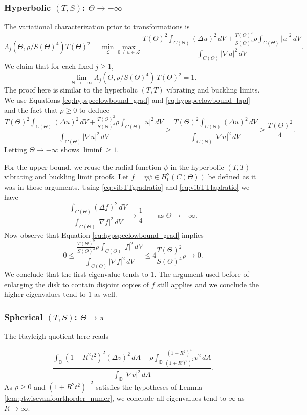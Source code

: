 \documentclass[11pt]{amsart}
\theoremstyle{definition}
\numberwithin{equation}{section}
\newcommand{\lapl}{\Delta}
\newcommand{\grad}{\nabla}
\newcommand{\D}{\mathbb{D}}
\begin{document}
\subsubsection*{Hyperbolic $(T,S)$: $\Theta \to -\infty$} 

The variational characterization prior to transformations is
\[
\Lambda_j(\Theta, \rho/S(\Theta)^4)T(\Theta)^2 = \min_{\mathcal{L}}\max_{0 \neq u \in \mathcal{L}}\dfrac{T(\Theta)^2\displaystyle \int_{C(\Theta)} (\lapl u)^2 \, dV +  \frac{T(\Theta)^{2}}{S(\Theta)^4} \rho\int_{C(\Theta)} | u|^2 \, dV} {\displaystyle \int_{C(\Theta)}  |\grad u|^2 \, dV}.
\]
We claim that for each fixed $j\ge 1$,
\[
\lim_{\Theta\to-\infty}\Lambda_j(\Theta,\rho/S(\Theta)^4)\,T(\Theta)^2=1.
\]
The proof here is similar to the hyperbolic $(T,T)$ vibrating and buckling limits. We use Equations \eqref{eq:hypspeclowbound--grad} and \eqref{eq:hypspeclowbound--lapl} and the fact that $\rho \geq 0$ to deduce
\[
\dfrac{T(\Theta)^2\displaystyle \int_{C(\Theta)} (\lapl u)^2 \, dV +  \frac{T(\Theta)^{2}}{S(\Theta)^4} \rho\int_{C(\Theta)} | u|^2 \, dV} {\displaystyle \int_{C(\Theta)}  |\grad u|^2 \, dV} \geq \dfrac{T(\Theta)^2\displaystyle \int_{C(\Theta)} (\lapl u)^2 \, dV} {\displaystyle \int_{C(\Theta)}  |\grad u|^2 \, dV} \geq \frac{T(\Theta)^2}{4}.
\]
Letting $\Theta \to -\infty$ shows $\liminf \geq 1$.

For the upper bound, we reuse the radial function $\psi$ in the hyperbolic $(T,T)$ vibrating and buckling limit proofs. Let $f=\eta\psi\in H_0^2(C(\Theta))$ be defined as it was in those arguments.
Using \eqref{eq:vibTTgradratio} and \eqref{eq:vibTTlaplratio} we have
\[
\frac{\int_{C(\Theta)}(\lapl f)^2\,dV}{\int_{C(\Theta)}|\grad f|^2\,dV}\to \frac14
\qquad\text{as }\Theta\to-\infty.
\]
Now observe that Equation \eqref{eq:hypspeclowbound--grad} implies
\[
0 \leq \dfrac{\frac{T(\Theta)^2}{S(\Theta)^4} \rho \int_{C(\Theta)} |f|^2 \, dV}{\int_{C(\Theta)}|\grad f|^2 \, dV } \leq  4\frac{T(\Theta)^2}{S(\Theta)^4}\rho \to 0.
\]
We conclude that the first eigenvalue tends to $1$. The argument used before of enlarging the disk to contain disjoint copies of $f$ still applies and we conclude the higher eigenvalues tend to $1$ as well.

\subsubsection*{Spherical $(T,S)$: $\Theta \to \pi$}

The Rayleigh quotient here reads

\[
\dfrac{\displaystyle \int_{\D}(1+R^2t^2)^2(\lapl v)^2 \,  dA +  \rho\int_{\D} \frac{(1+R^2)^4}{(1+R^2t^2)^2}v^2 \, dA}{\displaystyle \int_{\D} |\grad v|^2 \, dA}.
\]
As $\rho \geq 0$ and $(1+R^2t^2)^{-2}$ satisfies the hypotheses of Lemma \ref{lem:ptwisevanfourthorder--numer}, we conclude all eigenvalues tend to $\infty$ as $R \to \infty$.
\end{document}
